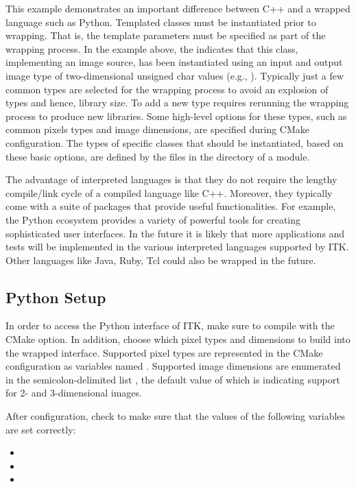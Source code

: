 This example demonstrates an important difference between C++ and a wrapped
language such as Python. Templated classes must be instantiated prior to
wrapping. That is, the template parameters must be specified as part of the
wrapping process. In the example above, the
 indicates that this class, implementing
an image source, has been
instantiated using an input and output image type of two-dimensional unsigned
char values (e.g., ). Typically just a few common types are
selected for the wrapping process to avoid an explosion of types and hence,
library size. To add a new type requires rerunning the wrapping process to
produce new libraries. Some high-level options for these types, such as
common pixels types and image dimensions, are specified during CMake
configuration.  The types of specific classes that should be instantiated,
based on these basic options, are defined by the  files in the
 directory of a module.

The advantage of interpreted languages is that they do not require the lengthy
compile/link cycle of a compiled language like C++. Moreover, they typically
come with a suite of packages that provide useful functionalities. For example,
the Python ecosystem provides a variety of powerful tools for creating
sophisticated user interfaces. In the future it is likely that more
applications and tests will be implemented in the various interpreted
languages supported by ITK. Other languages like Java, Ruby, Tcl could also be
wrapped in the future.

\subsection{Python Setup}

In order to access the Python interface of ITK, make sure to compile with the
CMake  option. In addition, choose which pixel
types and dimensions to build into the wrapped interface. Supported pixel types
are represented in the CMake configuration as variables named
. Supported image dimensions are enumerated in the
semicolon-delimited list , the default value of which is
 indicating support for 2- and 3-dimensional images.

After configuration, check to make sure that the values of the following variables
are set correctly:

\begin{itemize}
  \item {}
  \item {}
  \item {}
\end{itemize}

